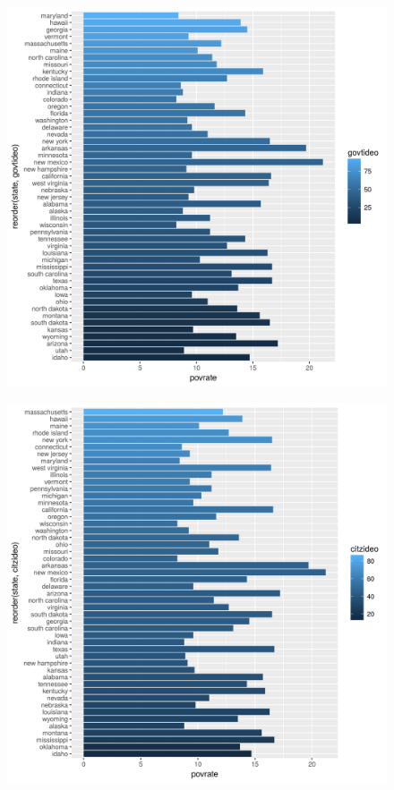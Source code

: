 \documentclass[11pt]{article}
\begin{document}
\begin{figure}[ht!]
\includegraphics[scale = .5]{graph3.png}
\centering
\end{figure}

\begin{figure}[ht!]
\includegraphics[scale = .5]{graph4.png}
\centering
\end{figure}
\end{document}
